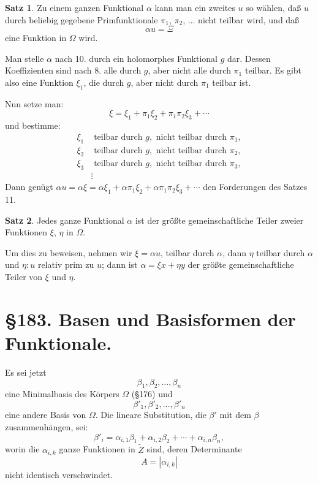 \documentclass[12pt,a4paper]{article}
\theoremstyle{definition}
\newtheorem{satz}{Satz}[section]
\begin{document}
\begin{satz}
Zu einem ganzen Funktional $\alpha$ kann man ein zweites $u$ so wählen, daß $u$ durch beliebig gegebene Primfunktionale $\pi_1$, $\pi_2$, $\ldots$ nicht teilbar wird, und daß
\begin{equation}
\alpha u = \Xi
\end{equation}
eine Funktion in $\Omega$ wird.
\end{satz}

Man stelle $\alpha$ nach 10. durch ein holomorphes Funktional $g$ dar. Dessen Koeffizienten sind nach 8. alle durch $g$, aber nicht alle durch $\pi_1$ teilbar. Es gibt also eine Funktion $\xi_1$, die durch $g$, aber nicht durch $\pi_1$ teilbar ist.

Nun setze man:
\[\xi = \xi_1 + \pi_1\xi_2 + \pi_1\pi_2\xi_3 + \cdots\]
und bestimme:
\begin{align*}
\xi_1 &\text{ teilbar durch } g, \text{ nicht teilbar durch } \pi_1, \\
\xi_2 &\text{ teilbar durch } g, \text{ nicht teilbar durch } \pi_2, \\
\xi_3 &\text{ teilbar durch } g, \text{ nicht teilbar durch } \pi_3, \\
&\vdots
\end{align*}
Dann genügt $\alpha u = \alpha\xi = \alpha\xi_1 + \alpha\pi_1\xi_2 + \alpha\pi_1\pi_2\xi_3 + \cdots$ den Forderungen des Satzes 11.

\begin{satz}
Jedes ganze Funktional $\alpha$ ist der größte gemeinschaftliche Teiler zweier Funktionen $\xi$, $\eta$ in $\Omega$.
\end{satz}

Um dies zu beweisen, nehmen wir $\xi = \alpha u$, teilbar durch $\alpha$, dann $\eta$ teilbar durch $\alpha$ und $\eta:u$ relativ prim zu $u$; dann ist $\alpha = \xi x + \eta y$ der größte gemeinschaftliche Teiler von $\xi$ und $\eta$.

\newpage
\section*{\S 183. Basen und Basisformen der Funktionale.}

Es sei jetzt
\begin{equation}
\beta_1, \beta_2, \ldots, \beta_n
\end{equation}
eine Minimalbasis des Körpers $\Omega$ (\S 176) und
\begin{equation}
\beta'_1, \beta'_2, \ldots, \beta'_n
\end{equation}
eine andere Basis von $\Omega$. Die lineare Substitution, die $\beta'$ mit dem $\beta$ zusammenhängen, sei:
\begin{equation}
\beta'_i = \alpha_{i,1}\beta_1 + \alpha_{i,2}\beta_2 + \cdots + \alpha_{i,n}\beta_n,
\end{equation}
worin die $\alpha_{i,k}$ ganze Funktionen in $\tilde{Z}$ sind, deren Determinante
\begin{equation}
A = |\alpha_{i,k}|
\end{equation}
nicht identisch verschwindet.
\end{document}
